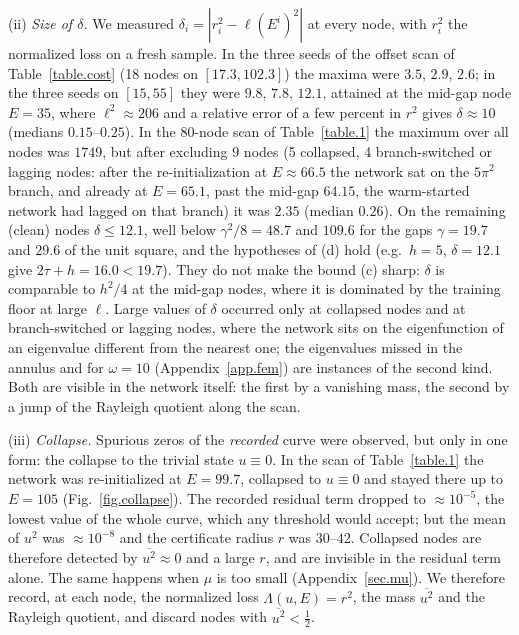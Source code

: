 \documentclass[10pt]{amsart}
\theoremstyle{definition}
\theoremstyle{remark}
\theoremstyle{plain}
\begin{document}
(ii) \emph{Size of $\delta$.} We measured $\delta_i=|r_i^2-\ell(E^i)^2|$ at every node, with $r_i^2$ the
normalized loss on a fresh sample. In the three seeds of the offset scan of Table~\ref{table.cost}
(18 nodes on $[17.3,102.3]$) the maxima were $3.5$, $2.9$, $2.6$; in the three seeds on $[15,55]$ they
were $9.8$, $7.8$, $12.1$, attained at the mid-gap node $E=35$, where $\ell^2\approx206$ and a relative
error of a few percent in $r^2$ gives $\delta\approx10$ (medians $0.15$--$0.25$). In the 80-node scan of
Table~\ref{table.1} the maximum over all nodes was $1749$, but after excluding $9$ nodes (5 collapsed,
4 branch-switched or lagging nodes: after the re-initialization at $E\approx66.5$ the network sat on the
$5\pi^2$ branch, and already at $E=65.1$, past the mid-gap $64.15$, the warm-started network had
lagged on that branch) it was $2.35$ (median $0.26$). On the remaining (clean) nodes $\delta\le12.1$, well
below $\gamma^2/8=48.7$ and $109.6$ for the gaps $\gamma=19.7$ and $29.6$ of the unit square, and the
hypotheses of (d) hold (e.g.\ $h=5$, $\delta=12.1$ give $2\tau+h=16.0<19.7$). They do not make the bound
(c) sharp: $\delta$ is comparable to $h^2/4$ at the mid-gap nodes, where it is dominated by the training
floor at large $\ell$. Large values of $\delta$ occurred only at collapsed nodes and at branch-switched or
lagging nodes, where the network sits on the eigenfunction of an eigenvalue different from the nearest
one; the eigenvalues missed in the annulus and for $\omega=10$ (Appendix~\ref{app.fem}) are instances of
the second kind. Both are visible in the network itself: the first by a vanishing mass, the second by a
jump of the Rayleigh quotient along the scan.

(iii) \emph{Collapse.} Spurious zeros of the \emph{recorded} curve were observed, but only in one form:
the collapse to the trivial state $u\equiv0$. In the scan of Table~\ref{table.1} the network was
re-initialized at $E=99.7$, collapsed to $u\equiv0$ and stayed there up to $E=105$
(Fig.~\ref{fig.collapse}). The recorded residual term dropped to $\approx10^{-5}$, the lowest value of
the whole curve, which any threshold would accept; but the mean of $u^2$ was $\approx10^{-8}$ and the
certificate radius $r$ was $30$--$42$. Collapsed nodes are therefore detected by $\overline{u^2}\approx0$
and a large $r$, and are invisible in the residual term alone. The same happens when $\mu$ is too small
(Appendix~\ref{sec.mu}). We therefore record, at each node, the normalized loss $\Lambda(u,E)=r^2$, the
mass $\overline{u^2}$ and the Rayleigh quotient, and discard nodes with $\overline{u^2}<\frac12$.
\end{document}
